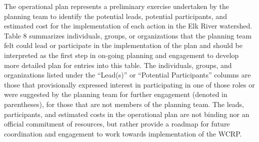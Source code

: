 \documentclass[
  letterpaper,
  DIV=11,
  numbers=noendperiod]{scrreprt}
\begin{document}
The operational plan represents a preliminary exercise undertaken by the
planning team to identify the potential leads, potential participants,
and estimated cost for the implementation of each action in the Elk
River watershed. Table 8 summarizes individuals, groups, or
organizations that the planning team felt could lead or participate in
the implementation of the plan and should be interpreted as the first
step in on-going planning and engagement to develop more detailed plan
for entries into this table. The individuals, groups, and organizations
listed under the ``Lead(s)'' or ``Potential Participants'' columns are
those that provisionally expressed interest in participating in one of
those roles or were suggested by the planning team for further
engagement (denoted in parentheses), for those that are not members of
the planning team. The leads, participants, and estimated costs in the
operational plan are not binding nor an official commitment of
resources, but rather provide a roadmap for future coordination and
engagement to work towards implementation of the WCRP.
\end{document}
